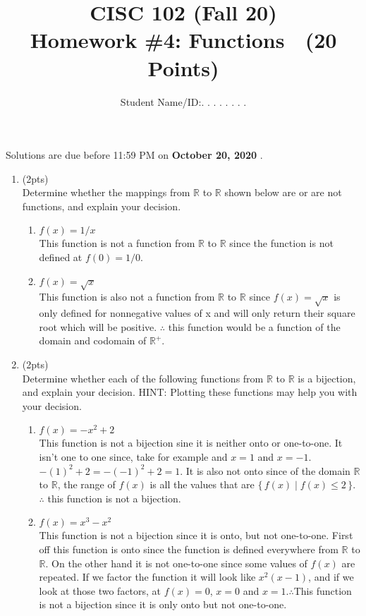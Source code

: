 \documentclass[12pt]{article}
\title{CISC 102 (Fall 20)\\ Homework \#4: Functions $\;$   (20 Points) }
\author{Student Name/ID:. . . . . . . .}
\date{}
\begin{document}
\maketitle

\par\noindent Solutions are due before 11:59 PM on \textbf{October 20, 2020 }.


\begin{enumerate}

\item (2pts) \\
Determine whether the mappings from   $ \mathbb{R}$ to $ \mathbb{R}$ shown below  are or are not functions, and explain your decision.
\begin{enumerate}
	\item $f(x) = 1/x$
    \\This function is not a function from $\mathbb{R}$ to $\mathbb{R}$ since the function is not defined at $f(0) = 1/0$.
	\item $f(x) = \sqrt{x}$
    \\This function is also not a function from $\mathbb{R}$ to $\mathbb{R}$ since $f(x) = \sqrt{x}$ is only defined for nonnegative values of x and will only return their square root which will be positive. $\therefore$ this function would be a function of the domain and codomain of $\mathbb{R}^+$.
\end{enumerate}


\item  (2pts) \\Determine whether each of the following functions from $\mathbb{R}$ to $\mathbb{R}$ is a bijection, and explain your decision. HINT: Plotting these functions may help you with your decision.
\begin{enumerate}
	\item $f(x) = -x^2 + 2$
    \\This function is not a bijection sine it is neither onto or one-to-one. It isn't one to one since, take for example and $x = 1$ and $x = -1$. $-(1)^2 + 2 = -(-1)^2 + 2 = 1$. It is also not onto since of the domain $\mathbb{R}$ to $\mathbb{R}$, the range of $f(x)$ is all the values that are $\{\,f(x)\mid f(x) \leq 2\,\}$. $\therefore$ this function is not a bijection.
	\item  $f(x) = x^3 - x^2$
    \\This function is not a bijection since it is onto, but not one-to-one. First off this function is onto since the function is defined everywhere from $\mathbb{R}$ to $\mathbb{R}$. On the other hand it is not one-to-one since some values of $f(x)$ are repeated. If we factor the function it will look like $x^2(x - 1)$, and if we look at those two factors, at $f(x) = 0$, $x = 0$ and $x = 1$.$\therefore$This function is not a bijection since it is only onto but not one-to-one.
\end{enumerate}


\end{enumerate}
\end{document}
